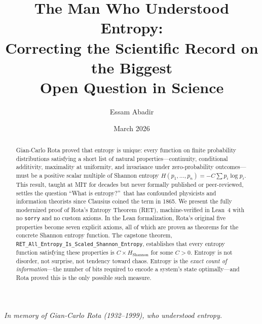 \documentclass[12pt,a4paper]{article}
\theoremstyle{definition}
\newcommand{\lean}[1]{\texttt{#1}}
\begin{document}
\title{%
  \textbf{The Man Who Understood Entropy:}\\[6pt]
  \large Correcting the Scientific Record on the Biggest\\
  Open Question in Science%
}
\author{Essam Abadir}
\date{March 2026}
\maketitle

\begin{center}
  \textit{In memory of Gian-Carlo Rota (1932--1999), who understood entropy.}
\end{center}

\vspace{1em}

\begin{abstract}
Gian-Carlo Rota proved that entropy is unique: every function on finite
probability distributions satisfying a short list of natural
properties---continuity, conditional additivity, maximality at
uniformity, and invariance under zero-probability outcomes---must be a
positive scalar multiple of Shannon entropy
$H(p_1,\dots,p_n) = -C\sum p_i \log p_i$.
This result, taught at MIT for decades but never formally published or
peer-reviewed, settles the question ``What is entropy?''\ that has
confounded physicists and information theorists since Clausius coined the
term in 1865.
We present the fully modernized proof of Rota's Entropy Theorem (RET),
machine-verified in Lean~4 with no \lean{sorry} and no custom axioms.
In the Lean formalization, Rota's original five properties become seven
explicit axioms, all of which are proven as theorems for the concrete
Shannon entropy function.
The capstone theorem,
\lean{RET\_All\_Entropy\_Is\_Scaled\_Shannon\_Entropy},
establishes that every entropy function satisfying these properties is
$C \times H_{\mathrm{Shannon}}$ for some $C > 0$.
Entropy is not disorder, not surprise, not tendency toward chaos.
Entropy is the \emph{exact count of information}---the number of bits
required to encode a system's state optimally---and Rota proved this is
the only possible such measure.
\end{abstract}
\end{document}
